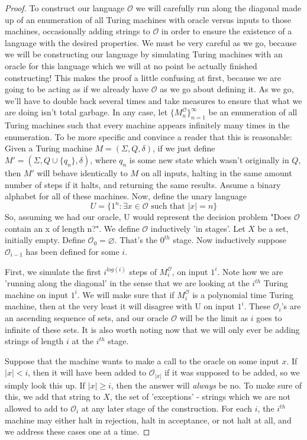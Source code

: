 \begin{proof}
    To construct our language $\mathcal{O}$ we will carefully run along the diagonal made up of an enumeration of all Turing machines with oracle versus inputs to those machines, occasionally adding strings to $\mathcal{O}$ in order to ensure the existence of a language with the desired properties. We must be very careful as we go, because we will be constructing our language by simulating Turing machines with an oracle for this language which we will at no point be actually finished constructing! This makes the proof a little confusing at first, because we are going to be acting as if we already have $\mathcal{O}$ as we go about defining it. As we go, we'll have to double back several times and take measures to ensure that what we are doing isn't total garbage. In any case, let $\{M_n^{\mathcal{O}}\}_{n=1}^\infty$ be an enumeration of all Turing machines such that every machine appears infinitely many times in the enumeration. To be more specific and convince a reader that this is reasonable: Given a Turing machine $M=(\Sigma,Q,\delta)$, if we just define $M'=(\Sigma,Q\cup \{q_n\},\delta)$, where $q_n$ is some new state which wasn't originally in $Q$, then $M'$ will behave identically to $M$ on all inputs, halting in the same amount number of steps if it halts, and returning the same results. Assume a binary alphabet for all of these machines. Now, define the unary language 
    \[U = \{1^n: \exists x \in \mathcal{O} \textrm{ such that } |x| = n \} \]
    So, assuming we had our oracle, U would represent the decision problem "Does $\mathcal{O}$ contain an x of length n?". We define $\mathcal{O}$ inductively 'in stages'. Let $X$ be a set, initially empty. Define $\mathcal{O}_0 = \varnothing$. That's the $0^{th}$ stage. Now inductively suppose $\mathcal{O}_{i-1}$ has been defined for some $i$. 
    \par First, we simulate the first $i^{log(i)}$ steps of $M_{i}^{\mathcal{O}}$, on input $1^i$. Note how we are 'running along the diagonal' in the sense that we are looking at the $i^{th}$ Turing machine on input $1^i$. We will make sure that if $M_i^{\mathcal{O}}$ is a polynomial time Turing machine, then at the very least it will disagree with U on input $1^i$. These $\mathcal{O}_i$'s are an ascending sequence of sets, and our oracle $\mathcal{O}$ will be the limit as $i$ goes to infinite of these sets. It is also worth noting now that we will only ever be adding strings of length $i$ at the $i^{th}$ stage. 
    \par Suppose that the machine wants to make a call to the oracle on some input $x$. If $|x|<i$, then it will have been added to $\mathcal{O}_{|x|}$ if it was supposed to be added, so we simply look this up. If $|x|\geq i$, then the answer will \textit{always} be no. To make sure of this, we add that string to $X$, the set of 'exceptions' - strings which we are not allowed to add to $\mathcal{O}_i$ at any later stage of the construction. For each $i$, the $i^{th}$ machine may either halt in rejection, halt in acceptance, or not halt at all, and we address these cases one at a time.

\end{proof}

